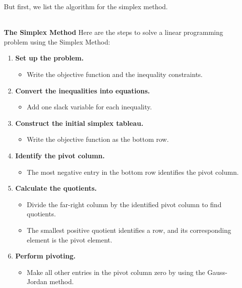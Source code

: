 But first, we list the algorithm for the simplex method.
\begin{summarybox}
    ~\\
    \textbf{The Simplex Method}
    Here are the steps to solve a linear programming problem using the Simplex Method:

    \begin{enumerate}
        \item \textbf{Set up the problem.}
              \begin{itemize}
                  \item Write the objective function and the inequality constraints.
              \end{itemize}

        \item \textbf{Convert the inequalities into equations.}
              \begin{itemize}
                  \item Add one slack variable for each inequality.
              \end{itemize}

        \item \textbf{Construct the initial simplex tableau.}
              \begin{itemize}
                  \item Write the objective function as the bottom row.
              \end{itemize}

        \item \textbf{Identify the pivot column.}
              \begin{itemize}
                  \item The most negative entry in the bottom row identifies the pivot column.
              \end{itemize}

        \item \textbf{Calculate the quotients.}
              \begin{itemize}
                  \item Divide the far-right column by the identified pivot column to find quotients.
                  \item The smallest positive quotient identifies a row, and its corresponding element is the pivot element.
              \end{itemize}

        \item \textbf{Perform pivoting.}
              \begin{itemize}
                  \item Make all other entries in the pivot column zero by using the Gauss-Jordan method.
              \end{itemize}


\end{enumerate}
\end{summarybox}
